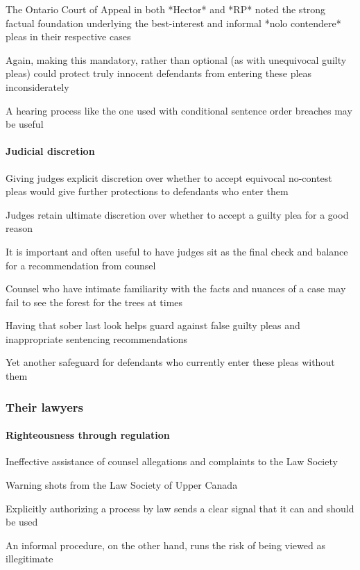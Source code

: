 The Ontario Court of Appeal in both *Hector* and *RP* noted the strong factual foundation underlying the best-interest and informal *nolo contendere* pleas in their respective cases

Again, making this mandatory, rather than optional (as with unequivocal guilty pleas) could protect truly innocent defendants from entering these pleas inconsiderately

A hearing process like the one used with conditional sentence order breaches may be useful

\paragraph{Judicial discretion\\}

Giving judges explicit discretion over whether to accept equivocal no-contest pleas would give further protections to defendants who enter them

Judges retain ultimate discretion over whether to accept a guilty plea for a good reason

It is important and often useful to have judges sit as the final check and balance for a recommendation from counsel

Counsel who have intimate familiarity with the facts and nuances of a case may fail to see the forest for the trees at times

Having that sober last look helps guard against false guilty pleas and inappropriate sentencing recommendations

Yet another safeguard for defendants who currently enter these pleas without them

\subsubsection{Their lawyers}
\paragraph{Righteousness through regulation\\}

Ineffective assistance of counsel allegations and complaints to the Law Society

Warning shots from the Law Society of Upper Canada

Explicitly authorizing a process by law sends a clear signal that it can and should be used

An informal procedure, on the other hand, runs the risk of being viewed as illegitimate

